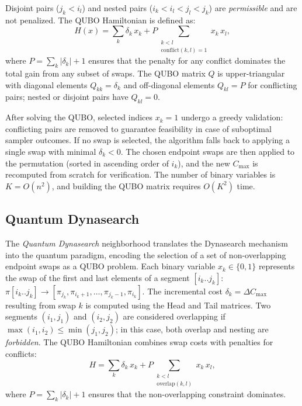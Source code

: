 \documentclass[10pt,twoside,twocolumn,a4paper]{article}
\begin{document}
Disjoint pairs ($j_k < i_l$) and nested pairs ($i_k < i_l < j_l < j_k$) are \emph{permissible} and are not penalized. The QUBO Hamiltonian is defined as:
\begin{equation}
    H(x) = \sum_{k} \delta_k\, x_k
          + P \!\sum_{\substack{k < l \\ \mathrm{conflict}(k,l)=1}} x_k\, x_l,
    \label{eq:qubo_motz}
\end{equation}
where $P = \sum_k |\delta_k| + 1$ ensures that the penalty for any conflict dominates the total gain from any subset of swaps. The QUBO matrix $Q$ is upper-triangular with diagonal elements $Q_{kk} = \delta_k$ and off-diagonal elements $Q_{kl} = P$ for conflicting pairs; nested or disjoint pairs have $Q_{kl} = 0$.

After solving the QUBO, selected indices $x_k = 1$ undergo a greedy validation: conflicting pairs are removed to guarantee feasibility in case of suboptimal sampler outcomes. If no swap is selected, the algorithm falls back to applying a single swap with minimal $\delta_k < 0$. The chosen endpoint swaps are then applied to the permutation (sorted in ascending order of $i_k$), and the new $C_{\max}$ is recomputed from scratch for verification. The number of binary variables is $K = O(n^2)$, and building the QUBO matrix requires $O(K^2)$ time.


\subsection{Quantum Dynasearch}
The \emph{Quantum Dynasearch} neighborhood translates the Dynasearch mechanism into the quantum paradigm, encoding the selection of a set of non-overlapping endpoint swaps as a QUBO problem. Each binary variable $x_k \in \{0,1\}$ represents the swap of the first and last elements of a segment $[i_k..j_k]$:
$\pi[i_k..j_k] \to [\pi_{j_k}, \pi_{i_k+1}, \ldots, \pi_{j_k-1}, \pi_{i_k}]$.  
The incremental cost $\delta_k = \Delta C_{\max}$ resulting from swap $k$ is computed using the Head and Tail matrices. Two segments $(i_1,j_1)$ and $(i_2,j_2)$ are considered overlapping if $\max(i_1,i_2) \le \min(j_1,j_2)$; in this case, both overlap and nesting are \emph{forbidden}. The QUBO Hamiltonian combines swap costs with penalties for conflicts:
\begin{equation}
    H = \sum_{k} \delta_k\, x_k
        + P \!\sum_{\substack{k < l \\ \mathrm{overlap}(k,l)}} x_k\, x_l,
    \label{eq:qubo_dyna}
\end{equation}
where $P = \sum_k |\delta_k| + 1$ ensures that the non-overlapping constraint dominates.
\end{document}
